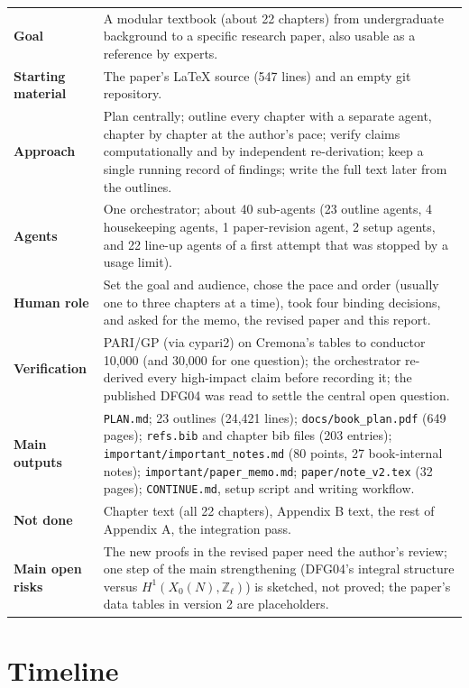\documentclass[11pt]{article}
\begin{document}
{\small
\begin{xltabular}{\linewidth}{>{\bfseries}p{3.6cm}L}
\toprule
Goal & A modular textbook (about 22 chapters) from undergraduate background to a specific research paper, also
usable as a reference by experts.\\
Starting material & The paper's LaTeX source (547 lines) and an empty git repository.\\
Approach & Plan centrally; outline every chapter with a separate agent, chapter by chapter at the author's pace;
verify claims computationally and by independent re-derivation; keep a single running record of findings;
write the full text later from the outlines.\\
Agents & One orchestrator; about 40 sub-agents (23 outline agents, 4 housekeeping agents, 1 paper-revision agent,
2 setup agents, and 22 line-up agents of a first attempt that was stopped by a usage limit).\\
Human role & Set the goal and audience, chose the pace and order (usually one to three chapters at a time), took
four binding decisions, and asked for the memo, the revised paper and this report.\\
Verification & PARI/GP (via cypari2) on Cremona's tables to conductor 10{,}000 (and 30{,}000 for one question);
the orchestrator re-derived every high-impact claim before recording it; the published DFG04 was read to settle
the central open question.\\
Main outputs & \texttt{PLAN.md}; 23 outlines (24{,}421 lines); \texttt{docs/book\_plan.pdf} (649 pages);
\texttt{refs.bib} and chapter bib files (203 entries); \texttt{important/important\_notes.md} (80 points, 27
book-internal notes); \texttt{important/paper\_memo.md}; \texttt{paper/note\_v2.tex} (32 pages);
\texttt{CONTINUE.md}, setup script and writing workflow.\\
Not done & Chapter text (all 22 chapters), Appendix B text, the rest of Appendix A, the integration pass.\\
Main open risks & The new proofs in the revised paper need the author's review; one step of the main
strengthening (DFG04's integral structure versus $H^1(X_0(N),\mathbb Z_\ell)$) is sketched, not proved; the
paper's data tables in version 2 are placeholders.\\
\bottomrule
\end{xltabular}
}

\section{Timeline}
\end{document}
